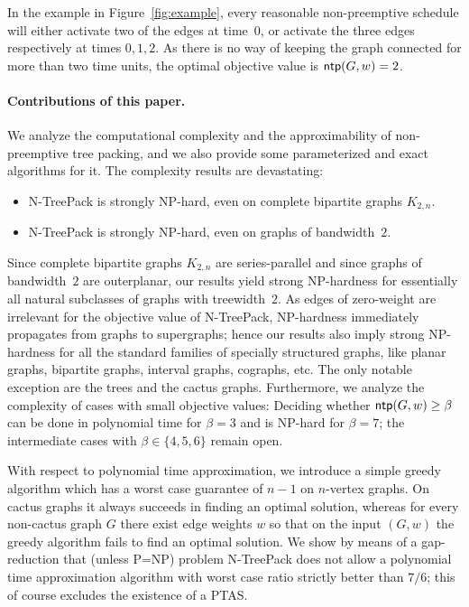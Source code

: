\documentclass[runningheads]{llncs}
\newcommand{\xxxNTP}{{\sc N-TreePack}}
\DeclareMathOperator{\ntp}{\text{\sf ntp}}
\begin{document}
In the example in Figure~\ref{fig:example}, every reasonable non-preemptive
schedule will either activate two of the edges at time~$0$, or activate the three
edges respectively at times $0,1,2$.
As there is no way of keeping the graph connected for more than two time units, 
the optimal objective value is $\ntp(G,w)=2$.

\paragraph{Contributions of this paper.}
We analyze the computational complexity and the approximability of non-preemptive 
tree packing, and we also provide some parameterized and exact algorithms for it.
The complexity results are devastating:
\begin{itemize}
\item {\xxxNTP} is strongly NP-hard, even on complete bipartite graphs $K_{2,n}$. 
\item {\xxxNTP} is strongly NP-hard, even on graphs of bandwidth~$2$.
\end{itemize}
Since complete bipartite graphs $K_{2,n}$ are series-parallel and since graphs of 
bandwidth~$2$ are outerplanar, our results yield strong NP-hardness for essentially 
all natural subclasses of graphs with treewidth~$2$.
As edges of zero-weight are irrelevant for the objective value of {\xxxNTP}, NP-hardness 
immediately propagates from graphs to supergraphs; hence our results also imply 
strong NP-hardness for all the standard families of specially structured graphs, 
like planar graphs, bipartite graphs, interval graphs, cographs, etc.
The only notable exception are the trees and the cactus graphs.
Furthermore, we analyze the complexity of cases with small objective values:
Deciding whether $\ntp(G,w)\ge\beta$ can be done in polynomial time for $\beta=3$
and is NP-hard for $\beta=7$; the intermediate cases with $\beta\in\{4,5,6\}$ remain open.

With respect to polynomial time approximation, we introduce a simple greedy algorithm
which has a worst case guarantee of $n-1$ on $n$-vertex graphs.
On cactus graphs it always succeeds in finding an optimal solution, whereas for every 
non-cactus graph $G$ there exist edge weights $w$ so that on the input $(G,w)$ the 
greedy algorithm fails to find an optimal solution.
We show by means of a gap-reduction that (unless P=NP) problem {\xxxNTP} does not
allow a polynomial time approximation algorithm with worst case ratio strictly better
than $7/6$; this of course excludes the existence of a PTAS.
\end{document}
